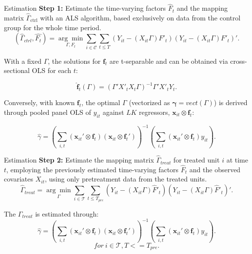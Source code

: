 \documentclass{beamer}
\begin{document}
\begin{frame}{Estimation}
    \textbf{Step 1:} Estimate the time-varying factors $\hat{F}_t$ and the mapping matrix $\hat{\Gamma}_{\text{ctrl}}$ with an ALS algorithm, based exclusively on data from the control group for the whole time period.
    \begin{equation*}
    (\hat{\Gamma}_{ctrl}, \hat{F_t}) = \underset{\Gamma, F_t}{\arg\min} \sum_{i \in \mathcal{C}} \sum_{t \leq T}\left( Y_{it} - (X_{it}\Gamma) F'_{t} \right)\left( Y_{it} - (X_{it}\Gamma) F'_{t} \right)'.
    \end{equation*}
    
    With a fixed $\Gamma$, the solutions for $\boldsymbol{f}_t$ are t-separable and can be obtained via cross-sectional OLS for each $t$:
    
    \begin{equation*}
    \hat{\boldsymbol{f}}_t(\Gamma) = (\Gamma' X'_t X_t \Gamma)^{-1} \Gamma' X'_t Y_t.
    \end{equation*}
    
    Conversely, with known $\boldsymbol{f}_{t}$, the optimal $\Gamma$ (vectorized as $\boldsymbol{\gamma} = vect(\Gamma)$) is derived through pooled panel OLS of $y_{it}$ against $LK$ regressors, $\boldsymbol{x}_{it} \otimes \boldsymbol{f}_t$:
    
    \begin{equation*}
    \hat{\gamma} = \left( \sum_{i,t} (\boldsymbol{x}_{it}' \otimes \boldsymbol{f}_t) (\boldsymbol{x}_{it} \otimes \boldsymbol{f}_t') \right)^{-1} \left( \sum_{i,t} (\boldsymbol{x}_{it}' \otimes \boldsymbol{f}_t) y_{it} \right).
    \end{equation*}
\end{frame}

\begin{frame}{Estimation}
    \textbf{Step 2:} Estimate the mapping matrix $\hat{\Gamma}_{treat}$ for treated unit $i$ at time $t$, employing the previously estimated time-varying factors $\hat{F}_t$ and the observed covariates $X_{it}$, using only pretreatment data from the treated units.
    \begin{equation*}
    \hat{\Gamma}_{treat} = \underset{\Gamma}{\arg\min} \sum_{i \in \mathcal{T}} \sum_{t \leq T_{pre}} \left( Y_{it} - (X_{it} \Gamma) \hat{F}'_{t} \right) \left( Y_{it} - (X_{it} \Gamma) \hat{F}'_{t} \right)'.
    \end{equation*}
    
    The $\Gamma_{treat}$ is estimated through:
    \begin{equation*}
        \hat{\gamma} = \left( \sum_{i,t} (\boldsymbol{x}_{it}' \otimes \boldsymbol{f}_t) (\boldsymbol{x}_{it} \otimes \boldsymbol{f}_t') \right)^{-1} \left( \sum_{i,t} (\boldsymbol{x}_{it}' \otimes \boldsymbol{f}_t) y_{it} \right).
    \end{equation*}
    $$for \ i \in \mathcal{T}, T<= T_{pre}.$$
\end{frame}
\end{document}
